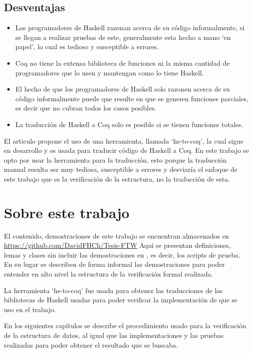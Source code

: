 \subsection{Desventajas}
\begin{itemize}
    \item Los programadores de Haskell razonan acerca de su código informalmente, si se llegan a
    realizar pruebas de este, generalmente esta hecho a mano `en papel', lo cual es tedioso y
    susceptible a errores.
    \item Coq no tiene la extensa biblioteca de funciones ni la misma cantidad de programadores
    que lo usen y mantengan como lo tiene Haskell.
    \item El hecho de que los programadores de Haskell solo razonen acerca de su código
    informalmente puede que resulte en que se generen funciones parciales, es decir que no cubran
    todos los casos posibles.
    \item La traducci\'on de Haskell a Coq solo es posible si se tienen funciones totales.
\end{itemize}

El articulo propone el uso de una herramienta, llamada `hs-to-coq', la cual sigue en desarrollo y
es usada para traducir código de Haskell a Coq. En este trabajo se opto por usar la herramienta
para la traducci\'on, esto porque la traducci\'on manual resulta ser muy tediosa, susceptible a
errores y desviaría el enfoque de este trabajo que es la verificaci\'on de la estructura, no la
traducci\'on de esta.

\section {Sobre este trabajo}
El contenido, demostraciones de este trabajo se encuentran almacenados en
\url{https://github.com/DavidFHCh/Tesis-FTW} Aqu\'i se presentan definiciones, lemas y clases sin
incluir las demostraciones en {\coq}, es decir, los scripts de prueba. En su lugar se describen de
forma informal las demostraciones para poder entender en alto nivel la estructura de la
verificaci\'on formal realizada.

La herramienta `hs-to-coq' fue usada para obtener las traducciones de las bibliotecas de Haskell
usadas para poder verificar la implementación de {\arns} que se uso en el trabajo.

En los siguientes capítulos se describe el procedimiento usado para la verificaci\'on de la
estructura de datos, al igual que las implementaciones y las pruebas realizadas para poder obtener
el resultado que se buscaba.
